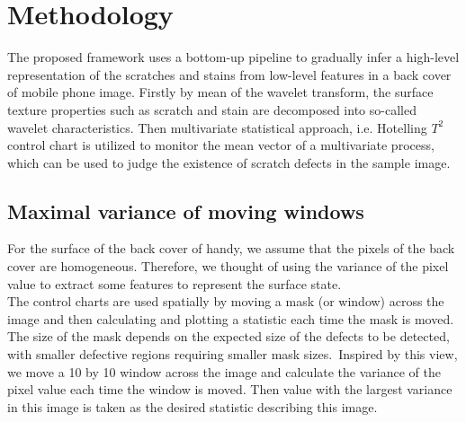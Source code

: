 \chapter{Methodology}
\label{cp:Methodology}

  The proposed framework uses a bottom-up pipeline to
gradually infer a high-level representation of the scratches and stains from low-level features in a back cover of mobile phone image. Firstly by mean of the wavelet transform, the surface texture properties such as scratch and stain are decomposed into so-called wavelet characteristics. Then multivariate statistical approach, i.e. Hotelling $T^{2}$ control chart is utilized to monitor the mean vector of a multivariate process, which can be used to judge the existence of scratch defects in the sample image.

\section{Maximal variance of moving windows}
For the surface of the back cover of handy, we assume that the pixels of the back cover are homogeneous. Therefore, we thought of using the variance of the pixel value to extract some features to represent the surface state. \\

The control charts are used spatially by moving a mask (or window) across the image and then calculating and plotting a statistic each time the mask is moved. The size of the mask depends on the expected size of the defects to be detected, with smaller defective regions requiring smaller mask sizes.~\cite{megahed2011review}Inspired by this view, we move a 10 by 10 window across the image and calculate the variance of the pixel value each time the window is moved. Then value with the largest variance in this image is taken as the desired statistic describing this image.


